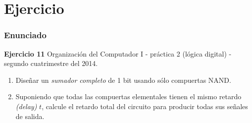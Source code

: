 \documentclass[mathserif,hyperref]{beamer}
\begin{document}
\section{Ejercicio}

\begin{frame}
\frametitle{Enunciado}
\textbf{Ejercicio 11}
{\tiny Organización del Computador I - práctica 2 (lógica digital) - segundo
cuatrimestre del 2014.}
\begin{enumerate}
  \item Diseñar un \textit{sumador completo} de 1 bit usando sólo compuertas
  NAND.
  \item Suponiendo que todas las compuertas elementales tienen el mismo
  retardo \textit{(delay)} $t$, calcule el retardo total del circuito para
  producir todas sus señales de salida.
\end{enumerate}
\end{frame}
\end{document}
